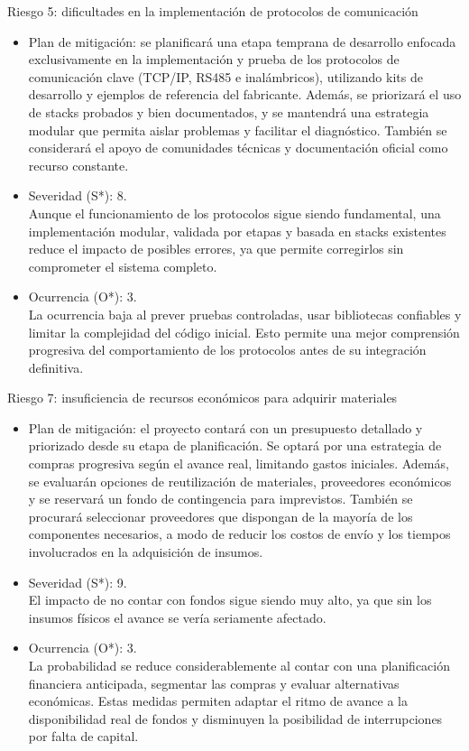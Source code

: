 \documentclass[
11pt, %
]{charter}
\begin{document}
Riesgo 5: dificultades en la implementación de protocolos de comunicación
\begin{itemize}
	\item Plan de mitigación: se planificará una etapa temprana de desarrollo enfocada exclusivamente en la implementación y prueba de los protocolos de comunicación clave (TCP/IP, RS485 e inalámbricos), utilizando kits de desarrollo y ejemplos de referencia del fabricante. Además, se priorizará el uso de stacks probados y bien documentados, y se mantendrá una estrategia modular que permita aislar problemas y facilitar el diagnóstico. También se considerará el apoyo de comunidades técnicas y documentación oficial como recurso constante.
	\item Severidad (S*): 8. \\ Aunque el funcionamiento de los protocolos sigue siendo fundamental, una implementación modular, validada por etapas y basada en stacks existentes reduce el impacto de posibles errores, ya que permite corregirlos sin comprometer el sistema completo.
	\item Ocurrencia (O*): 3. \\ La ocurrencia baja al prever pruebas controladas, usar bibliotecas confiables y limitar la complejidad del código inicial. Esto permite una mejor comprensión progresiva del comportamiento de los protocolos antes de su integración definitiva.
\end{itemize}

Riesgo 7: insuficiencia de recursos económicos para adquirir materiales
\begin{itemize}
	\item Plan de mitigación: el proyecto contará con un presupuesto detallado y priorizado desde su etapa de planificación. Se optará por una estrategia de compras progresiva según el avance real, limitando gastos iniciales. Además, se evaluarán opciones de reutilización de materiales, proveedores económicos y se reservará un fondo de contingencia para imprevistos. También se procurará seleccionar proveedores que dispongan de la mayoría de los componentes necesarios, a modo de reducir los costos de envío y los tiempos involucrados en la adquisición de insumos.
	\item Severidad (S*): 9. \\ El impacto de no contar con fondos sigue siendo muy alto, ya que sin los insumos físicos el avance se vería seriamente afectado.
	\item Ocurrencia (O*): 3. \\ La probabilidad se reduce considerablemente al contar con una planificación financiera anticipada, segmentar las compras y evaluar alternativas económicas. Estas medidas permiten adaptar el ritmo de avance a la disponibilidad real de fondos y disminuyen la posibilidad de interrupciones por falta de capital.
\end{itemize}
\end{document}
